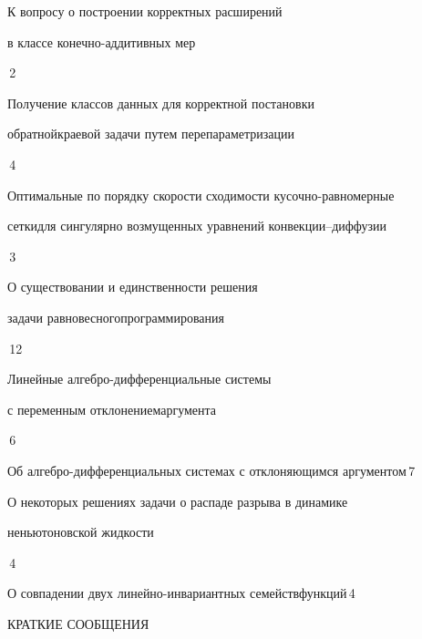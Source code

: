 

{К вопросу о построении корректных расширений


в классе конечно-\newline аддитивных мер}{\No\,2}






{Получение классов данных для корректной постановки


обратной\newline краевой задачи путем перепараметризации}{\No\,4}




{Оптимальные по порядку скорости сходимости кусочно-равномерные


сетки\newline для сингулярно возмущенных уравнений конвекции--диффузии}{\No\,3}




{О существовании и единственности решения


задачи равновесного\newline программирования}{\No\,12}




{Линейные алгебро-дифференциальные системы


с переменным отклонением\newline аргумента}{\No\,6}




{Об алгебро-дифференциальных системах с отклоняющимся аргументом}{\No\,7}




{О некоторых решениях задачи о распаде разрыва в динамике  \newline


неньютоновской жидкости}{\No\,4}




{О совпадении двух линейно-инвариантных семейств\newline функций}{\No\,4}











\bigskip


{\centerline {КРАТКИЕ СООБЩЕНИЯ}}


